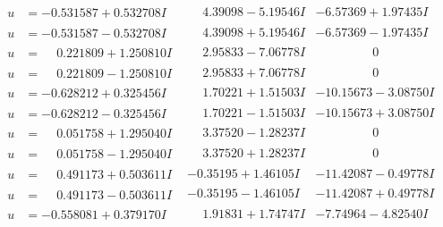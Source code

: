 \documentclass[1p]{elsarticle_modified}
\theoremstyle{definition}
\begin{document}
$$\begin{array}{c|c|c}
\begin{aligned}
u &= -0.531587 + 0.532708 I\end{aligned}
 & \phantom{-}4.39098 - 5.19546 I & -6.57369 + 1.97435 I \\ \hline\begin{aligned}
u &= -0.531587 - 0.532708 I\end{aligned}
 & \phantom{-}4.39098 + 5.19546 I & -6.57369 - 1.97435 I \\ \hline\begin{aligned}
u &= \phantom{-}0.221809 + 1.250810 I\end{aligned}
 & \phantom{-}2.95833 - 7.06778 I & \phantom{-0.000000 } 0 \\ \hline\begin{aligned}
u &= \phantom{-}0.221809 - 1.250810 I\end{aligned}
 & \phantom{-}2.95833 + 7.06778 I & \phantom{-0.000000 } 0 \\ \hline\begin{aligned}
u &= -0.628212 + 0.325456 I\end{aligned}
 & \phantom{-}1.70221 + 1.51503 I & -10.15673 - 3.08750 I \\ \hline\begin{aligned}
u &= -0.628212 - 0.325456 I\end{aligned}
 & \phantom{-}1.70221 - 1.51503 I & -10.15673 + 3.08750 I \\ \hline\begin{aligned}
u &= \phantom{-}0.051758 + 1.295040 I\end{aligned}
 & \phantom{-}3.37520 - 1.28237 I & \phantom{-0.000000 } 0 \\ \hline\begin{aligned}
u &= \phantom{-}0.051758 - 1.295040 I\end{aligned}
 & \phantom{-}3.37520 + 1.28237 I & \phantom{-0.000000 } 0 \\ \hline\begin{aligned}
u &= \phantom{-}0.491173 + 0.503611 I\end{aligned}
 & -0.35195 + 1.46105 I & -11.42087 - 0.49778 I \\ \hline\begin{aligned}
u &= \phantom{-}0.491173 - 0.503611 I\end{aligned}
 & -0.35195 - 1.46105 I & -11.42087 + 0.49778 I \\ \hline\begin{aligned}
u &= -0.558081 + 0.379170 I\end{aligned}
 & \phantom{-}1.91831 + 1.74747 I & -7.74964 - 4.82540 I \\ \hline\begin{aligned}

\end{aligned}
\end{array}$$
\end{document}
